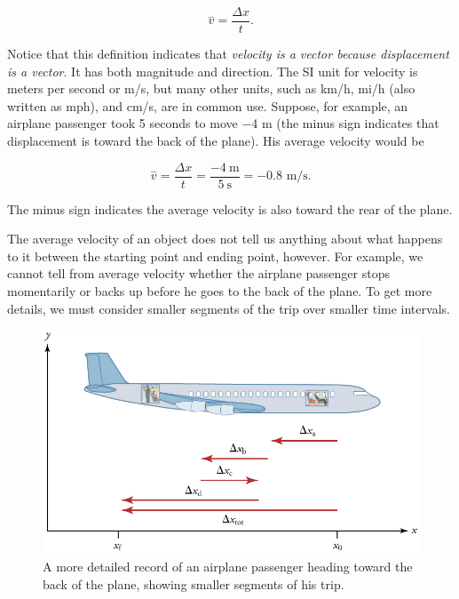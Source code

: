 \documentclass[
]{book}
\begin{document}
\leavevmode{}%
\[{{\overset{-}{v} = \frac{\Delta x}{t}}\text{.}}{}\]

Notice that this definition indicates that \emph{velocity is a vector because
displacement is a vector}. It has both magnitude and direction. The SI
unit for velocity is meters per second or m/s, but many other units,
such as km/h, mi/h (also written as mph), and cm/s, are in common use.
Suppose, for example, an airplane passenger took 5 seconds to move −4 m
(the minus sign indicates that displacement is toward the back of the
plane). His average velocity would be

\leavevmode{}%
\[{{{\overset{-}{v} = \frac{\Delta x}{t}} = \frac{- 4\ \text{m}}{5\ \text{s}}} = - \text{0.8\ m/s.}}{}\]

The minus sign indicates the average velocity is also toward the rear of
the plane.

The average velocity of an object does not tell us anything about what
happens to it between the starting point and ending point, however. For
example, we cannot tell from average velocity whether the airplane
passenger stops momentarily or backs up before he goes to the back of
the plane. To get more details, we must consider smaller segments of the
trip over smaller time intervals.

\begin{figure}
\hypertarget{import-auto-id1782958}{%
\centering
\includegraphics{images/Figure_02_02_01.jpg}
\caption{A more detailed record of an airplane passenger heading toward the
back of the plane, showing smaller segments of his
trip.}\label{import-auto-id1782958}
}
\end{figure}
\end{document}
